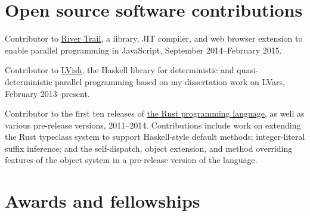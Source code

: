 \documentclass[10pt,letterpaper]{article}
\newenvironment{itemize*}
  {\begin{itemize}
      \setlength{\itemsep}{1pt}
      \setlength{\parskip}{3pt}
  }
  {\end{itemize}}
\begin{document}
\section*{Open source software contributions}
\begin{itemize*}

\item Contributor to
  \href{http://github.com/IntelLabs/RiverTrail}{River Trail}, a
  library, JIT compiler, and web browser extension to enable parallel
  programming in JavaScript, September 2014--February 2015.

\item Contributor to
  \href{http://hackage.haskell.org/package/lvish}{LVish}, the Haskell
  library for deterministic and quasi-deterministic parallel
  programming based on my dissertation work on LVars, February
  2013--present.

\item Contributor to the first ten releases of
  \href{http://rust-lang.org}{the Rust programming language},
  as well as various pre-release versions, 2011--2014.  Contributions
  include work on extending the Rust typeclass system to support
  Haskell-style default methods; integer-literal suffix inference; and
  the self-dispatch, object extension, and method overriding features
  of the object system in a pre-release version of the language.
\end{itemize*}

\section*{Awards and fellowships}
\end{document}
